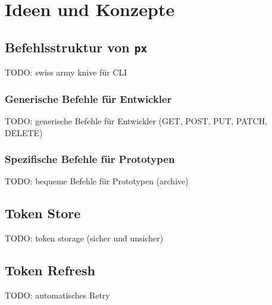 \section{Ideen und Konzepte}

\subsection{Befehlsstruktur von \texttt{px}}

TODO: swiss army knive \cite[p. 290]{gopl} für CLI

\subsubsection{Generische Befehle für Entwickler}

TODO: generische Befehle für Entwickler (GET, POST, PUT, PATCH, DELETE)

\subsubsection{Spezifische Befehle für Prototypen}

TODO: bequeme Befehle für Prototypen (archive)

\subsection{Token Store}
\label{sec:konzept-token-store}

TODO: token storage (sicher und unsicher)

\subsection{Token Refresh}

TODO: automatisches Retry

